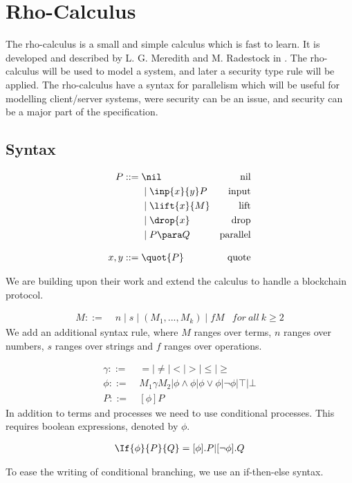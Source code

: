 \section{Rho-Calculus}
The rho-calculus is a small and simple calculus which is fast to learn.
It is developed and described by L. G. Meredith and M. Radestock in \citep{Meredith2005}.
The rho-calculus will be used to model a system, and later a security type rule will be applied.
The rho-calculus have a syntax for parallelism which will be useful for modelling client/server systems, were security can be an issue, and security can be a major part of the specification. 

\subsection{Syntax}
\begin{align*}
    P  ::= \; &  \nil & \text{nil} \\
      & \mid \inp{x}{y}P & \text{input} \\
      & \mid \lift{x}{M} & \text{lift} \\
      & \mid \drop{x} & \text{drop} \\
      & \mid P \para Q & \text{parallel} \\[3mm]
    x,y ::= \; & \quot{P} & \text{quote}\\
\end{align*}

We are building upon their work and extend the calculus to handle a blockchain protocol.

\begin{align*}
M::=\; & n \mid s \mid (M_1,...,M_k) \mid fM &for\ all\ k \geq 2
\end{align*}
We add an additional syntax rule, where $M$ ranges over terms, $n$ ranges over numbers, $s$ ranges over strings and $f$ ranges over operations.

\begin{align*}
\gamma ::=& \ =|\neq|<|>|\leq|\geq\\
\phi ::=& \ M_1\gamma M_2|\phi\land\phi|\phi\lor\phi|\neg\phi|\top|\bot\\
P::=& \ [\phi] P
\end{align*}
In addition to terms and processes we need to use conditional processes. This requires boolean expressions, denoted by \ensuremath{\phi}.

\begin{align*}
	\If{\phi}{P}{Q} = [\phi].P | [\neg \phi].Q
\end{align*}

To ease the writing of conditional branching, we use an if-then-else syntax.



